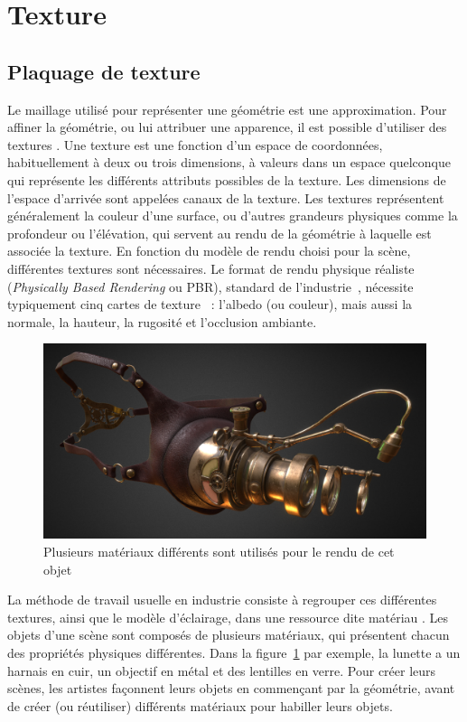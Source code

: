 \section{Texture}

\subsection*{Plaquage de texture}

Le maillage utilisé pour représenter une géométrie est une approximation. Pour affiner la géométrie, ou lui attribuer une apparence, il est possible d'utiliser des \og textures \fg. Une texture est une fonction d'un espace de coordonnées, habituellement à deux ou trois dimensions, à valeurs dans un espace quelconque qui représente les différents attributs possibles de la texture. Les dimensions de l'espace d'arrivée sont appelées \og canaux \fg de la texture. Les textures représentent généralement la couleur d'une surface, ou d'autres grandeurs physiques comme la profondeur ou l'élévation, qui servent au rendu de la géométrie à laquelle est associée la texture. En fonction du modèle de rendu choisi pour la scène, différentes textures sont nécessaires. Le format de rendu physique réaliste ({\it Physically Based Rendering} ou PBR), standard de l'industrie~\cite{hoffman_siggraph_2010}, nécessite typiquement cinq cartes de texture~\cite{pharr_physically_2023} : l'albedo (ou couleur), mais aussi la normale, la hauteur, la rugosité et l'occlusion ambiante.

\bigskip

\begin{figure}
    \centering
    \includegraphics[width=.65\textwidth]{contenu/resources/images/mutli-material-object}
    \caption[Rendu d'un objet comportant plusieurs matériaux]{Plusieurs matériaux différents sont utilisés pour le rendu de cet objet~\cite{lepkarepka_steampunk_2021}}
    \label{fig:multi-material}
\end{figure}

La méthode de travail usuelle en industrie consiste à regrouper ces différentes textures, ainsi que le modèle d'éclairage, dans une ressource dite \og matériau \fg. Les objets d'une scène sont composés de plusieurs matériaux, qui présentent chacun des propriétés physiques différentes. Dans la figure~\ref{fig:multi-material} par exemple, la lunette a un harnais en cuir, un objectif en métal et des lentilles en verre. Pour créer leurs scènes, les artistes façonnent leurs objets en commençant par la géométrie, avant de créer (ou réutiliser) différents matériaux pour habiller leurs objets.

